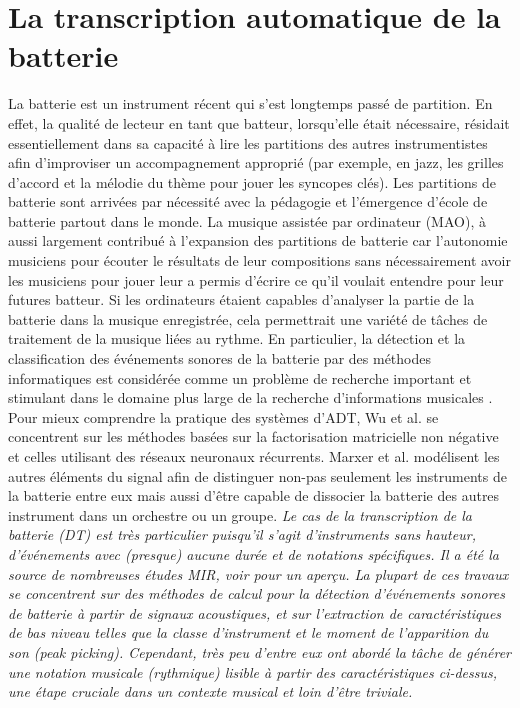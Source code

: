 \section{La transcription automatique de la batterie}
La batterie est un instrument récent qui s’est longtemps passé de partition. En effet, la qualité de lecteur en tant que batteur, lorsqu’elle était nécessaire, résidait essentiellement dans sa capacité à lire les partitions des autres instrumentistes afin d’improviser un accompagnement approprié (par exemple, en jazz, les grilles d’accord et la mélodie du thème pour jouer les syncopes clés). Les partitions de batterie sont arrivées par nécessité avec la pédagogie et l’émergence d’école de batterie partout dans le monde. La musique assistée par ordinateur (MAO), à aussi largement contribué à l’expansion des partitions de batterie car l’autonomie musiciens pour écouter le résultats de leur compositions sans nécessairement avoir les musiciens pour jouer leur a permis d’écrire ce qu’il voulait entendre pour leur futures batteur. 
Si les ordinateurs étaient capables d'analyser la partie de la batterie dans la musique enregistrée, cela permettrait une variété de tâches de traitement de la musique liées au rythme. En particulier, la détection et la classification des événements sonores de la batterie par des méthodes informatiques est considérée comme un problème de recherche important et stimulant dans le domaine plus large de la recherche d'informations musicales \cite{8350302}. Pour mieux comprendre la pratique des systèmes d’ADT, Wu et al. \cite{8350302} se concentrent sur les méthodes basées sur la factorisation matricielle non négative et celles utilisant des réseaux neuronaux récurrents. Marxer et al. \cite{2802} modélisent les autres éléments du signal afin de distinguer non-pas seulement les instruments de la batterie entre eux mais aussi d’être capable de dissocier la batterie des autres instrument dans un orchestre ou un groupe.
\textit{Le cas de la transcription de la batterie (DT) est très particulier puisqu'il s'agit d'instruments sans hauteur, d'événements avec (presque) aucune durée et de notations spécifiques. Il a été la source de nombreuses études MIR, voir \cite{8350302} pour un aperçu. La plupart de ces travaux se concentrent sur des méthodes de calcul pour la détection d'événements sonores de batterie à partir de signaux acoustiques, et sur l'extraction de caractéristiques de bas niveau telles que la classe d'instrument et le moment de l'apparition du son (peak picking). Cependant, très peu d'entre eux ont abordé la tâche de générer une notation musicale (rythmique) lisible à partir des caractéristiques ci-dessus, une étape cruciale dans un contexte musical et loin d'être triviale.}
